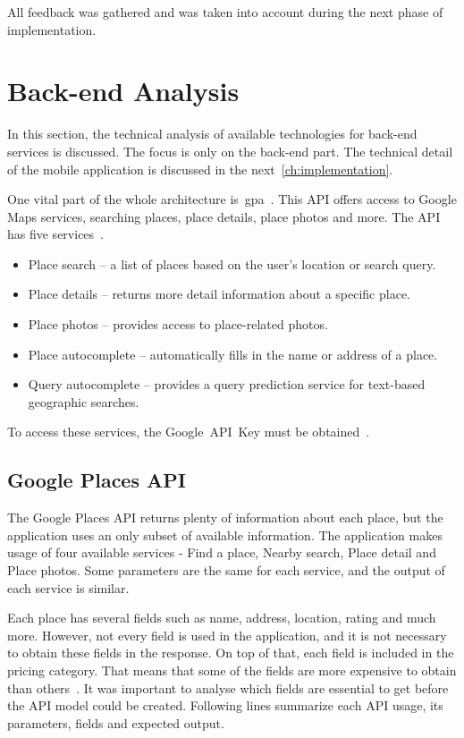 All feedback was gathered and was taken into account during the next phase of implementation.
\section{Back-end Analysis}
In this section, the technical analysis of available technologies for back-end services is discussed. The focus is only on the back-end part. The technical detail of the mobile application is discussed in the next~\cref{ch:implementation}.

One vital part of the whole architecture is~\gls{gpa}~\cite{google-places-api}. This API offers access to Google Maps services, searching places, place details, place photos and more. The API has five services~\cite{google-places-api}. 

\begin{itemize}
    \item Place search -- a list of places based on the user's location or search query.
    \item Place details -- returns more detail information about a specific place.
    \item Place photos -- provides access to place-related photos.
    \item Place autocomplete -- automatically fills in the name or address of a place.
    \item Query autocomplete -- provides a query prediction service for text-based geographic searches.
\end{itemize}

To access these services, the Google~API~Key must be obtained~\cite{google-places-api-key}.
\subsection{Google Places API}
The Google Places API returns plenty of information about each place, but the application uses an only subset of available information. The application makes usage of four available services - Find a place, Nearby search, Place detail and Place photos. Some parameters are the same for each service, and the output of each service is similar. 

Each place has several fields such as name, address, location, rating and much more. However, not every field is used in the application, and it is not necessary to obtain these fields in the response. On top of that, each field is included in the pricing category. That means that some of the fields are more expensive to obtain than others~\cite{google-places-api-billing}. It was important to analyse which fields are essential to get before the API model could be created. Following lines summarize each API usage, its parameters, fields and expected output.
